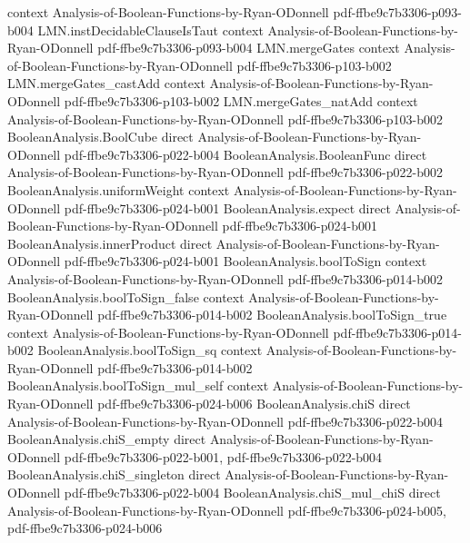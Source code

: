 \begin{lemma}
  {context}
  {Analysis-of-Boolean-Functions-by-Ryan-ODonnell}
  {pdf-ffbe9c7b3306-p093-b004}
\proofstep
  {LMN.instDecidableClauseIsTaut}
  {context}
  {Analysis-of-Boolean-Functions-by-Ryan-ODonnell}
  {pdf-ffbe9c7b3306-p093-b004}
\proofstep
  {LMN.mergeGates}
  {context}
  {Analysis-of-Boolean-Functions-by-Ryan-ODonnell}
  {pdf-ffbe9c7b3306-p103-b002}
\proofstep
  {LMN.mergeGates_castAdd}
  {context}
  {Analysis-of-Boolean-Functions-by-Ryan-ODonnell}
  {pdf-ffbe9c7b3306-p103-b002}
\proofstep
  {LMN.mergeGates_natAdd}
  {context}
  {Analysis-of-Boolean-Functions-by-Ryan-ODonnell}
  {pdf-ffbe9c7b3306-p103-b002}
\proofstep
  {BooleanAnalysis.BoolCube}
  {direct}
  {Analysis-of-Boolean-Functions-by-Ryan-ODonnell}
  {pdf-ffbe9c7b3306-p022-b004}
\proofstep
  {BooleanAnalysis.BooleanFunc}
  {direct}
  {Analysis-of-Boolean-Functions-by-Ryan-ODonnell}
  {pdf-ffbe9c7b3306-p022-b002}
\proofstep
  {BooleanAnalysis.uniformWeight}
  {context}
  {Analysis-of-Boolean-Functions-by-Ryan-ODonnell}
  {pdf-ffbe9c7b3306-p024-b001}
\proofstep
  {BooleanAnalysis.expect}
  {direct}
  {Analysis-of-Boolean-Functions-by-Ryan-ODonnell}
  {pdf-ffbe9c7b3306-p024-b001}
\proofstep
  {BooleanAnalysis.innerProduct}
  {direct}
  {Analysis-of-Boolean-Functions-by-Ryan-ODonnell}
  {pdf-ffbe9c7b3306-p024-b001}
\proofstep
  {BooleanAnalysis.boolToSign}
  {context}
  {Analysis-of-Boolean-Functions-by-Ryan-ODonnell}
  {pdf-ffbe9c7b3306-p014-b002}
\proofstep
  {BooleanAnalysis.boolToSign_false}
  {context}
  {Analysis-of-Boolean-Functions-by-Ryan-ODonnell}
  {pdf-ffbe9c7b3306-p014-b002}
\proofstep
  {BooleanAnalysis.boolToSign_true}
  {context}
  {Analysis-of-Boolean-Functions-by-Ryan-ODonnell}
  {pdf-ffbe9c7b3306-p014-b002}
\proofstep
  {BooleanAnalysis.boolToSign_sq}
  {context}
  {Analysis-of-Boolean-Functions-by-Ryan-ODonnell}
  {pdf-ffbe9c7b3306-p014-b002}
\proofstep
  {BooleanAnalysis.boolToSign_mul_self}
  {context}
  {Analysis-of-Boolean-Functions-by-Ryan-ODonnell}
  {pdf-ffbe9c7b3306-p024-b006}
\proofstep
  {BooleanAnalysis.chiS}
  {direct}
  {Analysis-of-Boolean-Functions-by-Ryan-ODonnell}
  {pdf-ffbe9c7b3306-p022-b004}
\proofstep
  {BooleanAnalysis.chiS_empty}
  {direct}
  {Analysis-of-Boolean-Functions-by-Ryan-ODonnell}
  {pdf-ffbe9c7b3306-p022-b001,
    pdf-ffbe9c7b3306-p022-b004}
\proofstep
  {BooleanAnalysis.chiS_singleton}
  {direct}
  {Analysis-of-Boolean-Functions-by-Ryan-ODonnell}
  {pdf-ffbe9c7b3306-p022-b004}
\proofstep
  {BooleanAnalysis.chiS_mul_chiS}
  {direct}
  {Analysis-of-Boolean-Functions-by-Ryan-ODonnell}
  {pdf-ffbe9c7b3306-p024-b005,
    pdf-ffbe9c7b3306-p024-b006}

\end{lemma}
